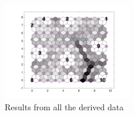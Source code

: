 \begin{figure}
        \centering
        \includegraphics[width=0.5\textwidth]{../../images0.01/M31/2D/diff_dimension/combine_2D_data_between_cols3and26.png}
    \caption{Results from all the derived data}
    \label{fig: all_derived_ones}
\end{figure}